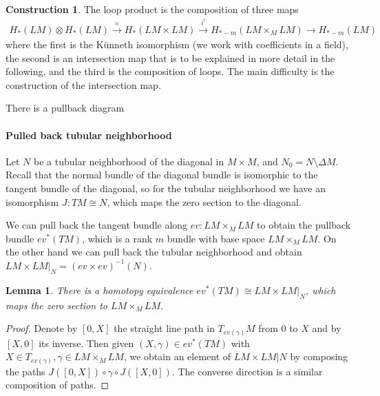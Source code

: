 \documentclass{scrartcl}
\theoremstyle{plain}
\newtheorem{lemma}[theorem]{Lemma}
\theoremstyle{definition}
\newtheorem{construction}[theorem]{Construction}
\newcommand{\iso}{\cong}
\newcommand{\defeq}{\coloneqq}
\let\xto\xrightarrow
\let\xfrom\xleftarrow
\begin{document}
\begin{construction}
The loop product is the composition of three maps
\begin{align*}
    H_*(LM)\otimes H_*(LM)\xto{\times} H_{*}(LM\times LM)\xto{i^!} H_{*-m}(LM\times_M LM)\to H_{*-m}(LM)
\end{align*}
where the first is the Künneth isomorphism (we work with coefficients in a field), the second is an intersection map that is to be explained in more detail in the following, and the third is the composition of loops. The main difficulty is the construction of the intersection map.
\end{construction}

There is a pullback diagram

\begin{center}
\end{center}





\paragraph{Pulled back tubular neighborhood} Let $N$ be a tubular neighborhood of the diagonal in $M\times M$, and $N_0 = N\setminus \Delta M$. Recall that the normal bundle of the diagonal bundle is isomorphic to the tangent bundle of the diagonal, so for the tubular neighborhood we have an isomorphism $J\colon TM\iso N$, which maps the zero section to the diagonal. 

We can pull back the tangent bundle along $ev\colon LM\times_M LM$ to obtain the pullback bundle $ev^*(TM)$, which is a rank $m$ bundle with base space $LM\times_M LM$. On the other hand we can pull back the tubular neighborhood and obtain $LM\times LM|_N = (ev\times ev)^{-1}(N)$. \begin{lemma}
    There is a homotopy equivalence $ev^*(TM) \iso LM\times LM|_N$, which maps the zero section to $LM\times_M LM$. 
\end{lemma}
\begin{proof}
    Denote by $[0, X]$ the straight line path in $T_{ev(\gamma)}M$ from $0$ to $X$ and by $[X, 0]$ its inverse. Then given $(X, \gamma)\in ev^*(TM)$ with $X\in T_{ev(\gamma)}, \gamma\in LM\times_M LM$, we obtain an element of $LM\times LM|N$ by composing the paths $J([0, X]) \circ \gamma \circ J([X, 0])$. The converse direction is a similar composition of paths.
\end{proof}
\end{document}
